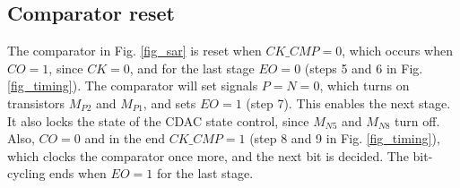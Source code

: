 \subsection{Comparator reset}
The comparator in Fig. \ref{fig_sar} is reset when $CK\_CMP=0$, which
occurs when $CO=1$, since $CK=0$, and
for the last stage $EO=0$ (steps 5 and 6 in Fig. \ref{fig_timing}). The comparator will set signals $P=N=0$, which turns on transistors $M_{P2}$ and $M_{P1}$, and sets $EO=1$ (step 7). This enables the next stage. It also locks the state of the
CDAC state control,
since $M_{N5}$ and $M_{N8}$ turn off. Also, $CO=0$ and in the end $CK\_CMP=1$ (step 8 and 9 in Fig. \ref{fig_timing}),
which clocks the comparator once more, and the next bit is decided.
The bit-cycling ends when $EO=1$ for the last stage.
